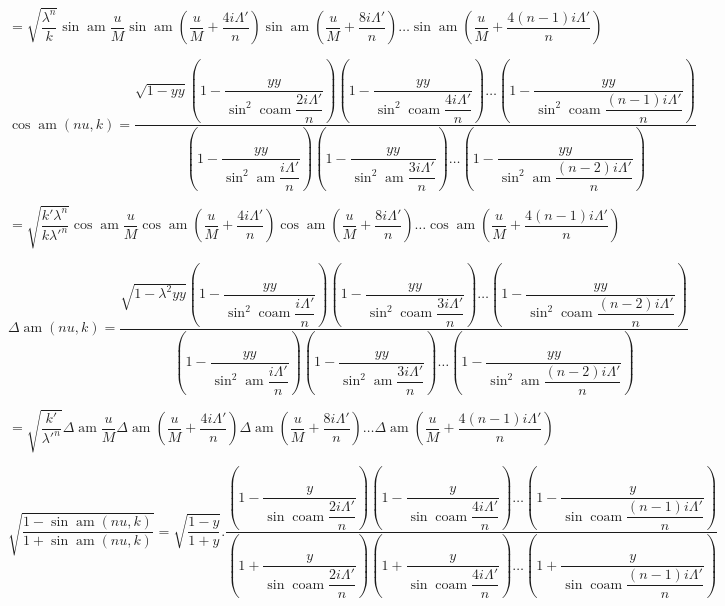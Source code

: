 \documentclass{article}
\begin{document}
\[
=\sqrt{\frac{\lambda^{n}}{k}}\sin\operatorname{am}\frac{u}{M}\sin\operatorname{am}\left(\frac{u}{M}+\frac{4i\Lambda'}{n}\right)\sin\operatorname{am}\left(\frac{u}{M}+\frac{8i\Lambda'}{n}\right)\ldots\sin\operatorname{am}\left(\frac{u}{M}+\frac{4(n-1)i\Lambda'}{n}\right)
\]

\[
\cos\operatorname{am}(nu,k)=\frac{\sqrt{1-yy}\left(1-\dfrac{yy}{\sin^{2}\operatorname{coam}\dfrac{2i\Lambda'}{n}}\right)\left(1-\dfrac{yy}{\sin^{2}\operatorname{coam}\dfrac{4i\Lambda'}{n}}\right)\ldots\left(1-\dfrac{yy}{\sin^{2}\operatorname{coam}\dfrac{(n-1)i\Lambda'}{n}}\right)}{\left(1-\dfrac{yy}{\sin^{2}\operatorname{am}\dfrac{i\Lambda'}{n}}\right)\left(1-\dfrac{yy}{\sin^{2}\operatorname{am}\dfrac{3i\Lambda'}{n}}\right)\ldots\left(1-\dfrac{yy}{\sin^{2}\operatorname{am}\dfrac{(n-2)i\Lambda'}{n}}\right)}
\]

\[
=\sqrt{\frac{k'\lambda^{n}}{k\lambda'^{n}}}\cos\operatorname{am}\frac{u}{M}\cos\operatorname{am}\left(\frac{u}{M}+\frac{4i\Lambda'}{n}\right)\cos\operatorname{am}\left(\frac{u}{M}+\frac{8i\Lambda'}{n}\right)\ldots\cos\operatorname{am}\left(\frac{u}{M}+\frac{4(n-1)i\Lambda'}{n}\right)
\]

\[
\Delta\operatorname{am}(nu,k)=\frac{\sqrt{1-\lambda^{2}yy}\left(1-\dfrac{yy}{\sin^{2}\operatorname{coam}\dfrac{i\Lambda'}{n}}\right)\left(1-\dfrac{yy}{\sin^{2}\operatorname{coam}\dfrac{3i\Lambda'}{n}}\right)\ldots\left(1-\dfrac{yy}{\sin^{2}\operatorname{coam}\dfrac{(n-2)i\Lambda'}{n}}\right)}{\left(1-\dfrac{yy}{\sin^{2}\operatorname{am}\dfrac{i\Lambda'}{n}}\right)\left(1-\dfrac{yy}{\sin^{2}\operatorname{am}\dfrac{3i\Lambda'}{n}}\right)\ldots\left(1-\dfrac{yy}{\sin^{2}\operatorname{am}\dfrac{(n-2)i\Lambda'}{n}}\right)}
\]

\[
=\sqrt{\frac{k'}{\lambda'^{n}}}\Delta\operatorname{am}\frac{u}{M}\Delta\operatorname{am}\left(\frac{u}{M}+\frac{4i\Lambda'}{n}\right)\Delta\operatorname{am}\left(\frac{u}{M}+\frac{8i\Lambda'}{n}\right)\ldots\Delta\operatorname{am}\left(\frac{u}{M}+\frac{4(n-1)i\Lambda'}{n}\right)
\]

\[
\sqrt{\frac{1-\sin\operatorname{am}(nu,k)}{1+\sin\operatorname{am}(nu,k)}}=\sqrt{\frac{1-y}{1+y}}.\frac{\left(1-\dfrac{y}{\sin\operatorname{coam}\dfrac{2i\Lambda'}{n}}\right)\left(1-\dfrac{y}{\sin\operatorname{coam}\dfrac{4i\Lambda'}{n}}\right)\ldots\left(1-\dfrac{y}{\sin\operatorname{coam}\dfrac{(n-1)i\Lambda'}{n}}\right)}{\left(1+\dfrac{y}{\sin\operatorname{coam}\dfrac{2i\Lambda'}{n}}\right)\left(1+\dfrac{y}{\sin\operatorname{coam}\dfrac{4i\Lambda'}{n}}\right)\ldots\left(1+\dfrac{y}{\sin\operatorname{coam}\dfrac{(n-1)i\Lambda'}{n}}\right)}
\]
\end{document}
